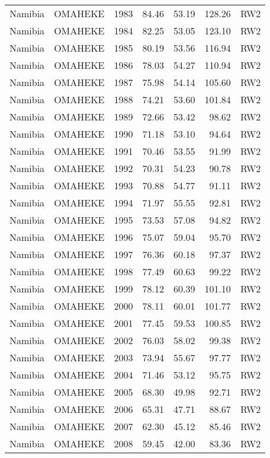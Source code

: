 \begin{longtable}{lllrrrl}
  Namibia & OMAHEKE & 1983 & 84.46 & 53.19 & 128.26 & RW2 \\ 
  Namibia & OMAHEKE & 1984 & 82.25 & 53.05 & 123.10 & RW2 \\ 
  Namibia & OMAHEKE & 1985 & 80.19 & 53.56 & 116.94 & RW2 \\ 
  Namibia & OMAHEKE & 1986 & 78.03 & 54.27 & 110.94 & RW2 \\ 
  Namibia & OMAHEKE & 1987 & 75.98 & 54.14 & 105.60 & RW2 \\ 
  Namibia & OMAHEKE & 1988 & 74.21 & 53.60 & 101.84 & RW2 \\ 
  Namibia & OMAHEKE & 1989 & 72.66 & 53.42 & 98.62 & RW2 \\ 
  Namibia & OMAHEKE & 1990 & 71.18 & 53.10 & 94.64 & RW2 \\ 
  Namibia & OMAHEKE & 1991 & 70.46 & 53.55 & 91.99 & RW2 \\ 
  Namibia & OMAHEKE & 1992 & 70.31 & 54.23 & 90.78 & RW2 \\ 
  Namibia & OMAHEKE & 1993 & 70.88 & 54.77 & 91.11 & RW2 \\ 
  Namibia & OMAHEKE & 1994 & 71.97 & 55.55 & 92.81 & RW2 \\ 
  Namibia & OMAHEKE & 1995 & 73.53 & 57.08 & 94.82 & RW2 \\ 
  Namibia & OMAHEKE & 1996 & 75.07 & 59.04 & 95.70 & RW2 \\ 
  Namibia & OMAHEKE & 1997 & 76.36 & 60.18 & 97.37 & RW2 \\ 
  Namibia & OMAHEKE & 1998 & 77.49 & 60.63 & 99.22 & RW2 \\ 
  Namibia & OMAHEKE & 1999 & 78.12 & 60.39 & 101.10 & RW2 \\ 
  Namibia & OMAHEKE & 2000 & 78.11 & 60.01 & 101.77 & RW2 \\ 
  Namibia & OMAHEKE & 2001 & 77.45 & 59.53 & 100.85 & RW2 \\ 
  Namibia & OMAHEKE & 2002 & 76.03 & 58.02 & 99.38 & RW2 \\ 
  Namibia & OMAHEKE & 2003 & 73.94 & 55.67 & 97.77 & RW2 \\ 
  Namibia & OMAHEKE & 2004 & 71.46 & 53.12 & 95.75 & RW2 \\ 
  Namibia & OMAHEKE & 2005 & 68.30 & 49.98 & 92.71 & RW2 \\ 
  Namibia & OMAHEKE & 2006 & 65.31 & 47.71 & 88.67 & RW2 \\ 
  Namibia & OMAHEKE & 2007 & 62.30 & 45.12 & 85.46 & RW2 \\ 
  Namibia & OMAHEKE & 2008 & 59.45 & 42.00 & 83.36 & RW2 \\ 

\end{longtable}
